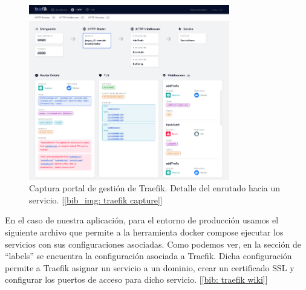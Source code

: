 \documentclass[a4paper, oneside, 12pt]{book}
\begin{document}
	\begin{figure}[h!]
		\begin{center}
			\includegraphics[width=0.78\textwidth]{img/traefik_example.png}
			\caption{Captura portal de gestión de Traefik. Detalle del enrutado hacia un servicio. [\ref{bib_img: traefik capture}]}
		\end{center}
	\end{figure}
	
	\pagebreak
	
	\noindent En el caso de nuestra aplicación, para el entorno de producción usamos el siguiente archivo que permite a la herramienta docker compose ejecutar los servicios con sus configuraciones asociadas. Como podemos ver, en la sección de ``labels'' se encuentra la configuración asociada a Traefik. Dicha configuración permite a Traefik asignar un servicio a un dominio, crear un certificado SSL y configurar los puertos de acceso para dicho servicio. [\ref{bib: traefik wiki}]
	
\end{document}
